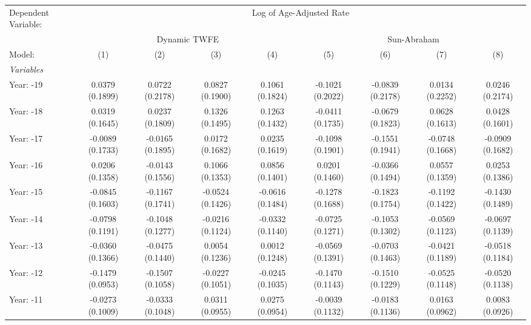 
\begingroup
\centering
\tiny
\begin{tabular}{lcccccccc}
   \tabularnewline \midrule \midrule
   Dependent Variable: & \multicolumn{8}{c}{Log of Age-Adjusted Rate}\\
    & \multicolumn{4}{c}{Dynamic TWFE} & \multicolumn{4}{c}{Sun-Abraham} \\ 
   Model:                              & (1)              & (2)              & (3)              & (4)              & (5)              & (6)              & (7)              & (8)\\  
   \midrule
   \emph{Variables}\\
   Year: -19                           & 0.0379 (0.1899)  & 0.0722 (0.2178)  & 0.0827 (0.1900)  & 0.1061 (0.1824)  & -0.1021 (0.2022) & -0.0839 (0.2178) & 0.0134 (0.2252)  & 0.0246 (0.2174)\\   
   Year: -18                           & 0.0319 (0.1645)  & 0.0237 (0.1809)  & 0.1326 (0.1495)  & 0.1263 (0.1432)  & -0.0411 (0.1735) & -0.0679 (0.1823) & 0.0628 (0.1613)  & 0.0428 (0.1601)\\   
   Year: -17                           & -0.0089 (0.1733) & -0.0165 (0.1895) & 0.0172 (0.1682)  & 0.0235 (0.1619)  & -0.1098 (0.1901) & -0.1551 (0.1941) & -0.0748 (0.1668) & -0.0909 (0.1682)\\   
   Year: -16                           & 0.0206 (0.1358)  & -0.0143 (0.1556) & 0.1066 (0.1353)  & 0.0856 (0.1401)  & 0.0201 (0.1460)  & -0.0366 (0.1494) & 0.0557 (0.1359)  & 0.0253 (0.1386)\\   
   Year: -15                           & -0.0845 (0.1603) & -0.1167 (0.1741) & -0.0524 (0.1426) & -0.0616 (0.1484) & -0.1278 (0.1688) & -0.1823 (0.1754) & -0.1192 (0.1422) & -0.1430 (0.1489)\\   
   Year: -14                           & -0.0798 (0.1191) & -0.1048 (0.1277) & -0.0216 (0.1124) & -0.0332 (0.1140) & -0.0725 (0.1271) & -0.1053 (0.1302) & -0.0569 (0.1123) & -0.0697 (0.1139)\\   
   Year: -13                           & -0.0360 (0.1366) & -0.0475 (0.1440) & 0.0054 (0.1236)  & 0.0012 (0.1248)  & -0.0569 (0.1391) & -0.0703 (0.1463) & -0.0421 (0.1189) & -0.0518 (0.1184)\\   
   Year: -12                           & -0.1479 (0.0953) & -0.1507 (0.1058) & -0.0227 (0.1051) & -0.0245 (0.1035) & -0.1470 (0.1143) & -0.1510 (0.1229) & -0.0525 (0.1148) & -0.0520 (0.1138)\\   
   Year: -11                           & -0.0273 (0.1009) & -0.0333 (0.1048) & 0.0311 (0.0955)  & 0.0275 (0.0954)  & -0.0039 (0.1132) & -0.0183 (0.1136) & 0.0163 (0.0962)  & 0.0083 (0.0926)\\   

\end{tabular}
